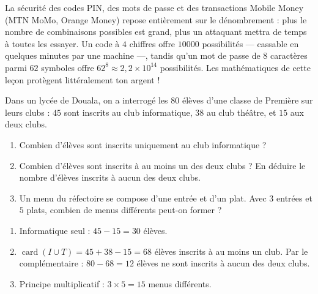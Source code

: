 \documentclass[11pt]{article}
\begin{document}
\begin{savaistu}
La sécurité des codes PIN, des mots de passe et des transactions Mobile Money (MTN MoMo, Orange Money) repose entièrement sur le dénombrement : plus le nombre de combinaisons possibles est grand, plus un attaquant mettra de temps à toutes les essayer. Un code à $4$ chiffres offre $\num{10000}$ possibilités — cassable en quelques minutes par une machine —, tandis qu'un mot de passe de $8$ caractères parmi $62$ symboles offre $62^8 \approx 2{,}2 \times 10^{14}$ possibilités. Les mathématiques de cette leçon protègent littéralement ton argent !
\end{savaistu}

\begin{exercice}
Dans un lycée de Douala, on a interrogé les $80$ élèves d'une classe de Première sur leurs clubs : $45$ sont inscrits au club informatique, $38$ au club théâtre, et $15$ aux deux clubs.
\begin{enumerate}
\item Combien d'élèves sont inscrits uniquement au club informatique ?
\item Combien d'élèves sont inscrits à au moins un des deux clubs ? En déduire le nombre d'élèves inscrits à aucun des deux clubs.
\item Un menu du réfectoire se compose d'une entrée et d'un plat. Avec $3$ entrées et $5$ plats, combien de menus différents peut-on former ?
\end{enumerate}
\end{exercice}

\begin{corrige}[Exercice 1]
\begin{enumerate}
\item Informatique seul : $45 - 15 = 30$ élèves.
\item $\operatorname{card}(I \cup T) = 45 + 38 - 15 = 68$ élèves inscrits à au moins un club. Par le complémentaire : $80 - 68 = 12$ élèves ne sont inscrits à aucun des deux clubs.
\item Principe multiplicatif : $3 \times 5 = 15$ menus différents.
\end{enumerate}
\end{corrige}
\end{document}
